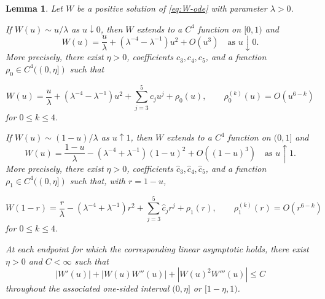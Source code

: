 \documentclass[12pt,preprint]{amsart}
\numberwithin{equation}{section}
\theoremstyle{plain}
\newtheorem{lemma}[theorem]{Lemma}
\theoremstyle{definition}
\begin{document}
\begin{lemma}
\label{lem:linear-branch-regularity}
Let $W$ be a positive solution of \eqref{eq:W-ode} with parameter
$\lambda>0$.

If $W(u)\sim u/\lambda$ as $u\downarrow0$, then $W$ extends to a
$C^4$ function on $[0,1)$ and
\begin{equation*}
 W(u)=\frac u\lambda+
 \left(\lambda^{-4}-\lambda^{-1}\right)u^2+O(u^3)
 \quad\text{as }u\downarrow0.
\end{equation*}
More precisely, there exist $\eta>0$, coefficients $c_3,c_4,c_5$, and a
function $\rho_0\in C^4((0,\eta])$ such that
\begin{samepage}
\begin{equation}
 W(u)=\frac u\lambda+
 \left(\lambda^{-4}-\lambda^{-1}\right)u^2
 +\sum_{j=3}^5c_ju^j+\rho_0(u),
 \qquad
 \rho_0^{(k)}(u)=O(u^{6-k})
 \label{eq:W-expansion-zero-differentiable}
\end{equation}
for $0\le k\le4$.
\end{samepage}


If $W(u)\sim(1-u)/\lambda$ as $u\uparrow1$, then $W$ extends to a
$C^4$ function on $(0,1]$ and
\begin{equation*}
 W(u)=\frac{1-u}{\lambda}
 -\left(\lambda^{-4}+\lambda^{-1}\right)(1-u)^2
 +O((1-u)^3)
 \quad\text{as }u\uparrow1.
\end{equation*}
More precisely, there exist $\eta>0$, coefficients
$\widehat c_3,\widehat c_4,\widehat c_5$, and a function
$\rho_1\in C^4((0,\eta])$ such that, with $r=1-u$,
\begin{samepage}
 \begin{equation}
 W(1-r)=\frac r\lambda
 -\left(\lambda^{-4}+\lambda^{-1}\right)r^2
 +\sum_{j=3}^5\widehat c_jr^j+\rho_1(r),
 \qquad
 \rho_1^{(k)}(r)=O(r^{6-k})
 \label{eq:W-expansion-one-differentiable}
\end{equation}
for $0\le k\le4$.
\end{samepage}


At each endpoint for which the corresponding linear asymptotic holds, there
exist $\eta>0$ and $C<\infty$ such that
\begin{equation}
 |W'(u)|+|W(u)W''(u)|+|W(u)^2W'''(u)|\le C
 \label{eq:W-relative-derivative-bounds}
\end{equation}
throughout the associated one-sided interval $(0,\eta]$ or
$[1-\eta,1)$.
\end{lemma}
\end{document}
